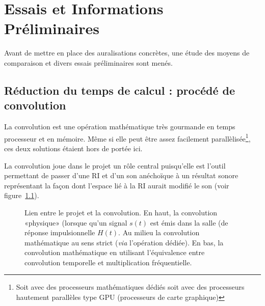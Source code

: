 \chapter{Essais et Informations Préliminaires}

Avant de mettre en place des auralisations concrètes, une étude des moyens de comparaison et divers
essais préliminaires sont menés.

%

\section{Réduction du temps de calcul : procédé de convolution} %
\label{acceleration_des_calculs}

La convolution est une opération mathématique très gourmande en temps processeur et en mémoire. Même si elle peut être
assez facilement parallèlisée\footnote{Soit avec des processeurs mathématiques dédiés soit avec des processeurs
hautement parallèles type GPU (processeurs de carte graphique)}, ces deux solutions étaient hors de portée ici.

La convolution joue dans le projet un rôle central puisqu'elle est l'outil permettant de passer d'une RI et d'un son
anéchoïque à un résultat sonore représentant la façon dont l'espace lié à la RI aurait modifié le son (voir
figure~\ref{lien_convo_projet}).

\begin{figure}[h!]
\caption{\label{lien_convo_projet}Lien entre le projet et la convolution. En haut, la convolution «physique» (lorsque
qu'un signal $s(t)$ est émis dans la salle (de réponse impulsionnelle $H(t)$. Au milieu la convolution mathématique au
sens strict (\textit{via} l'opération dédiée). En bas, la convolution mathématique en utilisant l'équivalence entre convolution temporelle et multiplication fréquentielle.}
\end{figure}

